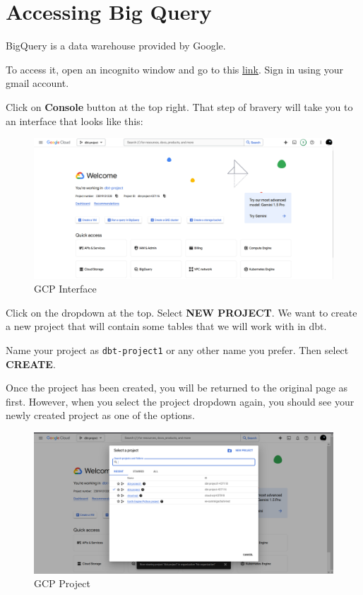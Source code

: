 \documentclass[
]{book}
\begin{document}
\hypertarget{accessing-big-query}{%
\section{Accessing Big Query}\label{accessing-big-query}}

BigQuery is a data warehouse provided by Google.

To access it, open an incognito window and go to this \href{https://cloud.google.com/}{link}. Sign in using your gmail account.

Click on \textbf{Console} button at the top right. That step of bravery will take you to an interface that looks like this:

\begin{figure}
\centering
\includegraphics{./images/gcp_interface.png}
\caption{GCP Interface}
\end{figure}

Click on the dropdown at the top. Select \textbf{NEW PROJECT}. We want to create a new project that will contain some tables that we will work with in dbt.

Name your project as \texttt{dbt-project1} or any other name you prefer. Then select \textbf{CREATE}.

Once the project has been created, you will be returned to the original page as first. However, when you select the project dropdown again, you should see your newly created project as one of the options.

\begin{figure}
\centering
\includegraphics{./images/gcp_project.png}
\caption{GCP Project}
\end{figure}
\end{document}
